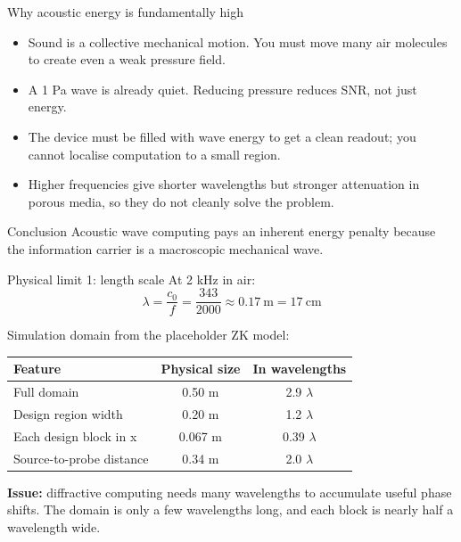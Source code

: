 \documentclass[aspectratio=169,11pt]{beamer}
\begin{document}
\begin{frame}{Why acoustic energy is fundamentally high}
  \small
  \begin{itemize}
    \item Sound is a collective mechanical motion. You must move many air molecules to create even a weak pressure field.
    \item A 1 Pa wave is already quiet. Reducing pressure reduces SNR, not just energy.
    \item The device must be filled with wave energy to get a clean readout; you cannot localise computation to a small region.
    \item Higher frequencies give shorter wavelengths but stronger attenuation in porous media, so they do not cleanly solve the problem.
  \end{itemize}

  \vspace{0.3cm}
  \begin{block}{Conclusion}
    Acoustic wave computing pays an inherent energy penalty because the information carrier is a macroscopic mechanical wave.
  \end{block}
\end{frame}

\begin{frame}{Physical limit 1: length scale}
  \small
  At 2 kHz in air:
  \[
    \lambda = \frac{c_0}{f} = \frac{343}{2000} \approx 0.17\ \text{m} = 17\ \text{cm}
  \]

  Simulation domain from the placeholder ZK model:
  \begin{center}
    \footnotesize
    \begin{tabular}{lcc}
      \toprule
      Feature & Physical size & In wavelengths \\
      \midrule
      Full domain & 0.50 m & 2.9 $\lambda$ \\
      Design region width & 0.20 m & 1.2 $\lambda$ \\
      Each design block in x & 0.067 m & 0.39 $\lambda$ \\
      Source-to-probe distance & 0.34 m & 2.0 $\lambda$ \\
      \bottomrule
    \end{tabular}
  \end{center}

  \vspace{0.2cm}
  \textbf{Issue:} diffractive computing needs many wavelengths to accumulate useful phase shifts. The domain is only a few wavelengths long, and each block is nearly half a wavelength wide.
\end{frame}
\end{document}
